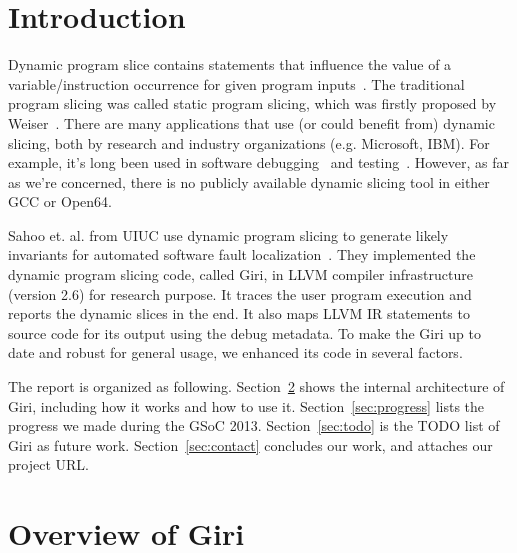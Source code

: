 \documentclass[DIV=calc, paper=a4, fontsize=11pt, twocolumn]{scrartcl}
\begin{document}
\section{Introduction}
Dynamic program slice contains statements that influence the value of a variable/instruction occurrence for given program inputs~\cite{agrawal1990dynamic}.
The traditional program slicing was called static program slicing, which was firstly proposed by Weiser~\cite{weiser}.
There are many applications that use (or could benefit from) dynamic slicing, both by research and industry organizations (e.g. Microsoft, IBM).
For example, it's long been used in software debugging~\cite{1993debugging,1999efficient} and testing~\cite{1993incremental}.
However, as far as we're concerned, there is no publicly available dynamic slicing tool in either GCC or Open64.

Sahoo et. al. from UIUC use dynamic program slicing to generate likely invariants for automated software fault localization~\cite{sahoo2013asplos}.
They implemented the dynamic program slicing code, called Giri, in LLVM compiler infrastructure (version 2.6) for research purpose.
It traces the user program execution and reports the dynamic slices in the end.
It also maps LLVM IR statements to source code for its output using the debug metadata.
To make the Giri up to date and robust for general usage,
we enhanced its code in several factors.

The report is organized as following.
Section~\ref{sec:overview} shows the internal architecture of Giri, including how it works and how to use it.
Section~\ref{sec:progress} lists the progress we made during the GSoC 2013.
Section~\ref{sec:todo} is the TODO list of Giri as future work.
Section~\ref{sec:contact} concludes our work, and attaches our project URL.

\section{Overview of Giri}
\label{sec:overview}

\end{document}
